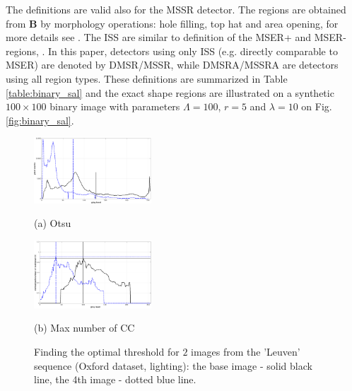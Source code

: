 \documentclass{article}
\def\B{{\mathbf B}}
\begin{document}
The definitions are valid also for the MSSR detector. The regions are obtained from $\B$ by morphology operations: hole filling, top hat and area opening, for more details see \cite{RangMSSR06, RangHumpb06}. The ISS are similar to definition of the MSER+ and MSER- regions, \cite{Matas2002BMVC}. In this paper, detectors using only ISS (e.g. directly comparable to MSER) are denoted by DMSR/MSSR, while DMSRA/MSSRA are detectors using all region types. These definitions are summarized in Table \ref{table:binary_sal} and the exact shape regions are illustrated on a synthetic $100 \times 100$ binary image with parameters $\Lambda=100$, $r=5$ and $\lambda = 10$ on Fig.\ref{fig:binary_sal}.


\begin{figure}[htb]

\begin{minipage}[b]{.495\linewidth}
  \centering
  \centerline{\includegraphics[width=4.4cm]{./Figs/hist_otsu_leuven_1_4}}
  \centerline{(a) Otsu}\medskip
\end{minipage}
\hfill
\begin{minipage}[b]{0.495\linewidth}
  \centering
  \centerline{\includegraphics[width=4.4cm]{./Figs/hist_numcc_leuven_1_4}}
  \centerline{(b) Max number of CC}\medskip
\end{minipage}
\vspace{-0.5cm}
\caption{Finding the optimal threshold for $2$ images from the 'Leuven' sequence 
(Oxford dataset, lighting): 
the base image - solid black line, the 4th image - dotted blue line.}
\label{fig:binary_hist}
%
\end{figure}
\end{document}
